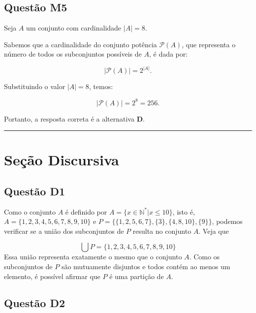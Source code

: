 \documentclass{article}
\begin{document}
\subsection{Questão M5}
Seja \( A \) um conjunto com cardinalidade \(|A| = 8\). 

Sabemos que a cardinalidade do conjunto potência \( \mathcal{P}(A) \), que representa o número de todos os subconjuntos possíveis de \( A \), é dada por:

\[
|\mathcal{P}(A)| = 2^{|A|}.
\]

Substituindo o valor \(|A| = 8\), temos:

\[
|\mathcal{P}(A)| = 2^8 = 256.
\]

Portanto, a resposta correta é a alternativa \(\mathbf{D}\).


\vspace{0.5em}
\hrule
\vspace{0.5em}

\section{Seção Discursiva}

\subsection{Questão D1}
Como o conjunto $A$ é definido por $A = \{ x \in \mathbb{N^*} | x \leq 10 \}$, isto é,
$A = \{1, 2, 3, 4, 5, 6, 7, 8, 9, 10\}$ e $P = \{\{1,2,5,6,7\},\{3\}, \{4, 8, 10\}, \{9\}\}$, podemos verificar se a união dos subconjuntos de $P$ resulta no conjunto $A$. Veja que

\[
\bigcup P = \{1, 2, 3, 4, 5, 6, 7, 8, 9, 10\}
\]
Essa união representa exatamente o mesmo que o conjunto $A$. Como os subconjuntos de $P$ são mutuamente disjuntos e todos contém ao menos um elemento, é possível afirmar que $P$ é uma partição de $A$.
\subsection{Questão D2}
\end{document}
